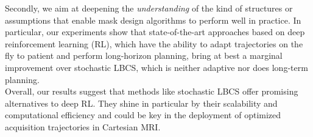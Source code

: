 
Secondly, we aim at deepening the \textit{understanding} of the kind of structures or assumptions that enable mask design algorithms to perform well in practice. In particular, our 
experiments show that state-of-the-art approaches based on deep reinforcement learning (RL), which have the ability to adapt trajectories on the fly to patient and perform long-horizon planning, bring at best a marginal improvement over stochastic LBCS, which is neither adaptive nor does long-term planning.\\ %

Overall, our results suggest that methods like stochastic LBCS offer promising alternatives to deep RL. They shine in particular by their scalability and computational efficiency and could be key in the deployment of optimized acquisition trajectories in Cartesian MRI.\\




